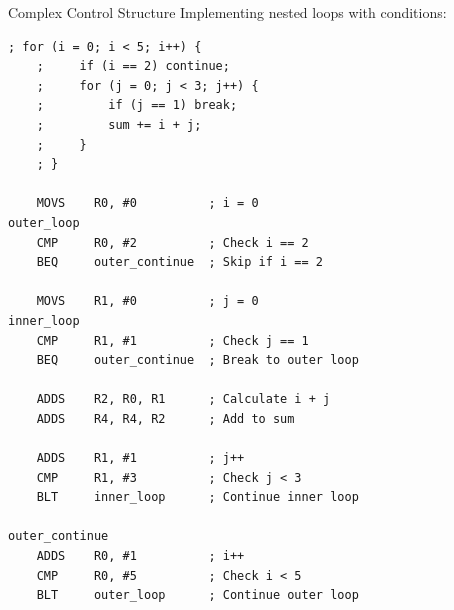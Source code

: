 \begin{example2}{Complex Control Structure}
Implementing nested loops with conditions:
\begin{lstlisting}[language=armasm, style=basesmol]
    ; for (i = 0; i < 5; i++) {
    ;     if (i == 2) continue;
    ;     for (j = 0; j < 3; j++) {
    ;         if (j == 1) break;
    ;         sum += i + j;
    ;     }
    ; }
    
    MOVS    R0, #0          ; i = 0
outer_loop
    CMP     R0, #2          ; Check i == 2
    BEQ     outer_continue  ; Skip if i == 2
    
    MOVS    R1, #0          ; j = 0
inner_loop
    CMP     R1, #1          ; Check j == 1
    BEQ     outer_continue  ; Break to outer loop
    
    ADDS    R2, R0, R1      ; Calculate i + j
    ADDS    R4, R4, R2      ; Add to sum
    
    ADDS    R1, #1          ; j++
    CMP     R1, #3          ; Check j < 3
    BLT     inner_loop      ; Continue inner loop
    
outer_continue
    ADDS    R0, #1          ; i++
    CMP     R0, #5          ; Check i < 5
    BLT     outer_loop      ; Continue outer loop
\end{lstlisting}
\end{example2}

